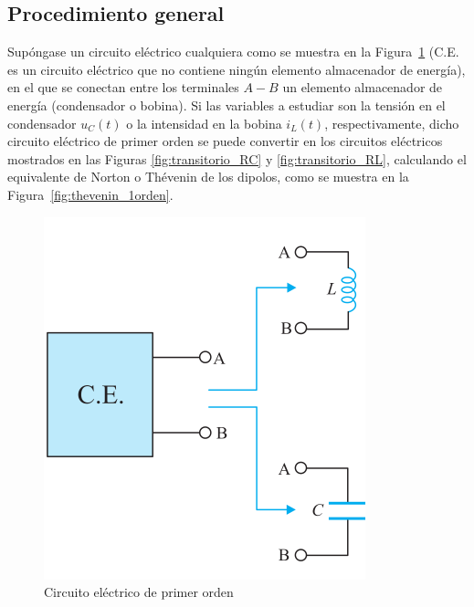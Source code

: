 
	
	
	
	
	
	
	
	
\subsection{Procedimiento general}
	
Supóngase un circuito eléctrico cualquiera como se muestra en la
Figura~\ref{fig:CE_primerorden} (C.E. es un circuito eléctrico que no
contiene ningún elemento almacenador de energía), en el que se
conectan entre los terminales $A-B$ un elemento almacenador de energía
(condensador o bobina). Si las variables a estudiar son la tensión en
el condensador $u_C(t)$ o la intensidad en la bobina $i_L(t)$,
respectivamente, dicho circuito eléctrico de primer orden se puede
convertir en los circuitos eléctricos mostrados en las Figuras
\ref{fig:transitorio_RC} y \ref{fig:transitorio_RL}, calculando el
equivalente de Norton o Thévenin de los dipolos, como se muestra en la
Figura~\ref{fig:thevenin_1orden}.
\begin{figure}[H]
  \centering
  \includegraphics[width=0.3\linewidth]{../figs/CE_primerorden.pdf}
  \caption{Circuito eléctrico de primer
    orden} \label{fig:CE_primerorden}
\end{figure}
	

